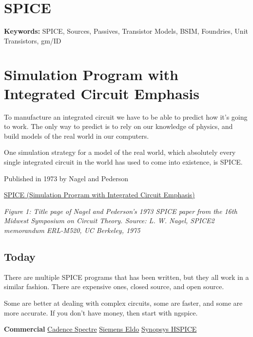 \section{SPICE}\label{spice}

\textbf{Keywords:} SPICE, Sources, Passives, Transistor Models, BSIM,
Foundries, Unit Transistors, gm/ID

\section{Simulation Program with Integrated Circuit
Emphasis}\label{simulation-program-with-integrated-circuit-emphasis}

To manufacture an integrated circuit we have to be able to predict how
it's going to work. The only way to predict is to rely on our knowledge
of physics, and build models of the real world in our computers.

One simulation strategy for a model of the real world, which absolutely
every single integrated circuit in the world has used to come into
existence, is SPICE.

Published in 1973 by Nagel and Pederson

\href{https://www2.eecs.berkeley.edu/Pubs/TechRpts/1973/ERL-m-382.pdf}{SPICE
(Simulation Program with Integrated Circuit Emphasis)}


{
\centering
{}
}

\emph{Figure 1: Title page of Nagel and Pederson's 1973 SPICE paper from
the 16th Midwest Symposium on Circuit Theory. Source: L. W. Nagel,
SPICE2 memorandum ERL-M520, UC Berkeley, 1975}

\subsection{Today}\label{today}

There are multiple SPICE programs that has been written, but they all
work in a similar fashion. There are expensive ones, closed source, and
open source.

Some are better at dealing with complex circuits, some are faster, and
some are more accurate. If you don't have money, then start with
ngspice.

\textbf{Commercial}
\href{https://www.cadence.com/ko_KR/home/tools/custom-ic-analog-rf-design/circuit-simulation/spectre-simulation-platform.html}{Cadence
Spectre} \href{https://eda.sw.siemens.com/en-US/ic/eldo/}{Siemens Eldo}
\href{https://www.synopsys.com/implementation-and-signoff/ams-simulation/primesim-hspice.html}{Synopsys
HSPICE}

